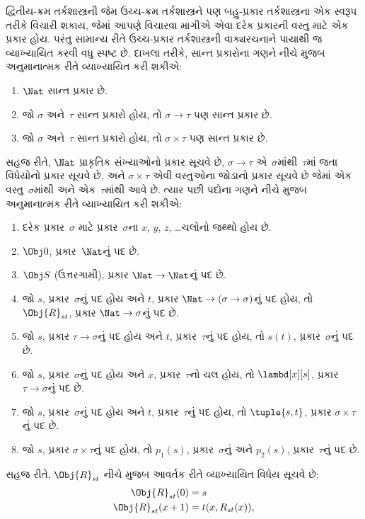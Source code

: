 દ્વિતીય-ક્રમ તર્કશાસ્ત્રની જેમ ઉચ્ચ-ક્રમ તર્કશાસ્ત્રને પણ બહુ-પ્રકાર
તર્કશાસ્ત્રના એક સ્વરૂપ તરીકે વિચારી શકાય, જેમાં આપણે વિચારવા માગીએ
એવા દરેક પ્રકારની વસ્તુ માટે એક પ્રકાર હોય. પરંતુ સામાન્ય રીતે
ઉચ્ચ-પ્રકાર તર્કશાસ્ત્રની વાક્યરચનાને પાયાથી જ વ્યાખ્યાયિત કરવી વધુ
સ્પષ્ટ છે. દાખલા તરીકે, સાન્ત પ્રકારોના ગણને નીચે મુજબ અનુમાનાત્મક રીતે
વ્યાખ્યાયિત કરી શકીએ:
\begin{enumerate}
\item $\Nat$ સાન્ત પ્રકાર છે.
\item જો $\sigma$ અને~$\tau$ સાન્ત પ્રકારો હોય, તો $\sigma
  \to \tau$ પણ સાન્ત પ્રકાર છે.
\item જો $\sigma$ અને~$\tau$ સાન્ત પ્રકારો હોય, તો $\sigma \times
  \tau$ પણ સાન્ત પ્રકાર છે.
\end{enumerate}
સહજ રીતે, $\Nat$ પ્રાકૃતિક સંખ્યાઓનો પ્રકાર સૂચવે છે,
$\sigma \to \tau$ એ~$\sigma$માંથી~$\tau$માં જતા વિધેયોનો પ્રકાર
સૂચવે છે, અને $\sigma \times \tau$ એવી વસ્તુઓના જોડાનો પ્રકાર સૂચવે
છે જેમાં એક વસ્તુ~$\sigma$માંથી અને એક~$\tau$માંથી આવે છે. ત્યાર પછી
પદોના ગણને નીચે મુજબ અનુમાનાત્મક રીતે વ્યાખ્યાયિત કરી શકીએ:
\begin{enumerate}
\item દરેક પ્રકાર~$\sigma$ માટે પ્રકાર~$\sigma$ના $x$, $y$, $z$, \dots ચલોનો
  જથ્થો હોય છે.
\item $\Obj 0$, પ્રકાર~$\Nat$નું પદ છે.
\item $\Obj S$ (ઉત્તરગામી), પ્રકાર $\Nat \to \Nat$નું પદ છે.
\item જો $s$, પ્રકાર~$\sigma$નું પદ હોય અને $t$, પ્રકાર
  $\Nat \to (\sigma \to \sigma)$નું પદ હોય, તો $\Obj{R}_{st}$,
  પ્રકાર $\Nat \to \sigma$નું પદ છે.
\item જો $s$, પ્રકાર $\tau \to \sigma$નું પદ હોય અને $t$,
  પ્રકાર~$\tau$નું પદ હોય, તો $s(t)$, પ્રકાર~$\sigma$નું પદ છે.
\item જો $s$, પ્રકાર~$\sigma$નું પદ હોય અને $x$, પ્રકાર~$\tau$નો ચલ
  હોય, તો $\lambd[x][s]$, પ્રકાર $\tau \to \sigma$નું પદ છે.
\item જો $s$, પ્રકાર~$\sigma$નું પદ હોય અને $t$, પ્રકાર~$\tau$નું પદ
  હોય, તો $\tuple{s, t}$, પ્રકાર $\sigma \times \tau$નું પદ છે.
\item જો $s$, પ્રકાર $\sigma \times \tau$નું પદ હોય, તો $p_1(s)$,
  પ્રકાર~$\sigma$નું અને $p_2(s)$, પ્રકાર~$\tau$નું પદ છે.
\end{enumerate}
સહજ રીતે, $\Obj{R}_{st}$ નીચે મુજબ આવર્તક રીતે વ્યાખ્યાયિત વિધેય
સૂચવે છે:
\begin{align*}
\Obj{R}_{st}(0) & = s \\
\Obj{R}_{st}(x+1) & = t(x, R_{st}(x)),
\end{align*}
